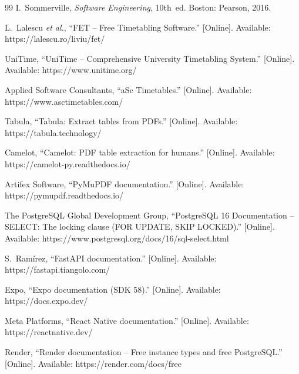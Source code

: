 \begin{thebibliography}{99}
I.~Sommerville, \emph{Software Engineering}, 10th~ed. Boston: Pearson, 2016.

L.~Lalescu \emph{et al.}, ``FET -- Free Timetabling Software.'' [Online]. Available:
https://lalescu.ro/liviu/fet/

UniTime, ``UniTime -- Comprehensive University Timetabling System.'' [Online]. Available:
https://www.unitime.org/

Applied Software Consultants, ``aSc Timetables.'' [Online]. Available: https://www.asctimetables.com/

Tabula, ``Tabula: Extract tables from PDFs.'' [Online]. Available: https://tabula.technology/

Camelot, ``Camelot: PDF table extraction for humans.'' [Online]. Available:
https://camelot-py.readthedocs.io/

Artifex Software, ``PyMuPDF documentation.'' [Online]. Available: https://pymupdf.readthedocs.io/

The PostgreSQL Global Development Group, ``PostgreSQL 16 Documentation -- SELECT: The locking
clause (FOR UPDATE, SKIP LOCKED).'' [Online]. Available: https://www.postgresql.org/docs/16/sql-select.html

S.~Ram\'irez, ``FastAPI documentation.'' [Online]. Available: https://fastapi.tiangolo.com/

Expo, ``Expo documentation (SDK 58).'' [Online]. Available: https://docs.expo.dev/

Meta Platforms, ``React Native documentation.'' [Online]. Available: https://reactnative.dev/

Render, ``Render documentation -- Free instance types and free PostgreSQL.'' [Online]. Available:
https://render.com/docs/free

\end{thebibliography}
